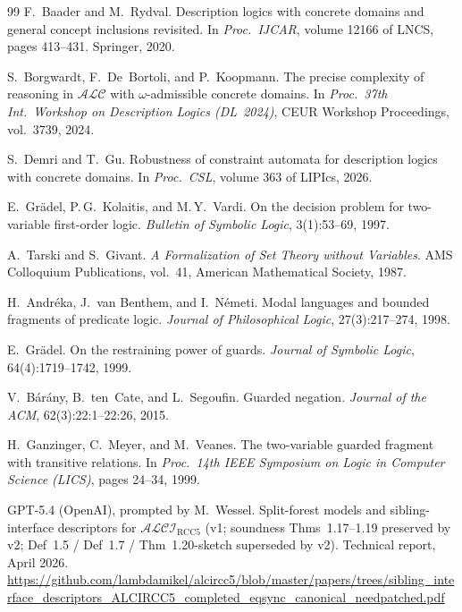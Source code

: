 \documentclass[11pt]{article}
\newcommand{\ALCIRCC}[1]{\mathcal{ALCI}_{\mathrm{RCC#1}}}
\newcommand{\ALC}{\ensuremath{\mathcal{ALC}}}
\theoremstyle{plain}
\theoremstyle{definition}
\begin{document}
\begin{thebibliography}{99}
F.\ Baader and M.\ Rydval.
\newblock Description logics with concrete domains and general concept
  inclusions revisited.
\newblock In \emph{Proc.\ IJCAR}, volume 12166 of LNCS, pages 413--431.
  Springer, 2020.

S.\ Borgwardt, F.\ De~Bortoli, and P.\ Koopmann.
\newblock The precise complexity of reasoning in $\ALC$ with
  $\omega$-admissible concrete domains.
\newblock In \emph{Proc.\ 37th Int.\ Workshop on Description Logics (DL~2024)},
  CEUR Workshop Proceedings, vol.\ 3739, 2024.

S.\ Demri and T.\ Gu.
\newblock Robustness of constraint automata for description logics with
  concrete domains.
\newblock In \emph{Proc.\ CSL}, volume 363 of LIPIcs, 2026.


E.\ Gr\"adel, P.\,G.\ Kolaitis, and M.\,Y.\ Vardi.
\newblock On the decision problem for two-variable first-order logic.
\newblock \emph{Bulletin of Symbolic Logic}, 3(1):53--69, 1997.

A.\ Tarski and S.\ Givant.
\newblock \emph{A Formalization of Set Theory without Variables}.
\newblock AMS Colloquium Publications, vol.~41, American Mathematical
  Society, 1987.

H.\ Andr\'eka, J.\ van Benthem, and I.\ N\'emeti.
\newblock Modal languages and bounded fragments of predicate logic.
\newblock \emph{Journal of Philosophical Logic}, 27(3):217--274, 1998.

E.\ Gr\"adel.
\newblock On the restraining power of guards.
\newblock \emph{Journal of Symbolic Logic}, 64(4):1719--1742, 1999.

V.\ B\'ar\'any, B.\ ten~Cate, and L.\ Segoufin.
\newblock Guarded negation.
\newblock \emph{Journal of the ACM}, 62(3):22:1--22:26, 2015.

H.\ Ganzinger, C.\ Meyer, and M.\ Veanes.
\newblock The two-variable guarded fragment with transitive relations.
\newblock In \emph{Proc.\ 14th IEEE Symposium on Logic in Computer Science
  (LICS)}, pages 24--34, 1999.


GPT-5.4 (OpenAI), prompted by M.\ Wessel.
\newblock Split-forest models and sibling-interface descriptors for
  $\ALCIRCC{5}$ (v1; soundness Thms~1.17--1.19 preserved by v2;
  Def~1.5 / Def~1.7 / Thm~1.20-sketch superseded by v2).
\newblock Technical report, April 2026.
\newblock \url{https://github.com/lambdamikel/alcircc5/blob/master/papers/trees/sibling_interface_descriptors_ALCIRCC5_completed_eqsync_canonical_needpatched.pdf}


\end{thebibliography}
\end{document}
